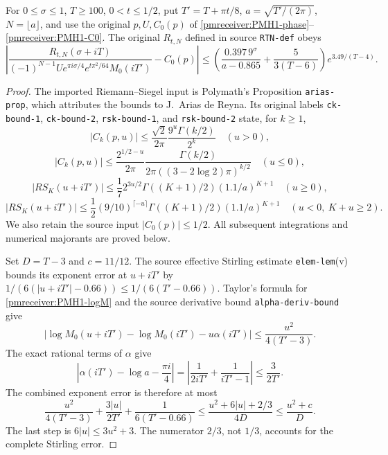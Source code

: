 \begin{pmreceivertheorem}
\label{pmreceiver:PMH11}
For $0\le\sigma\le1$, $T\ge100$, $0<t\le1/2$, put
$T'=T+\pi t/8$, $a=\sqrt{T'/(2\pi)}$, $N=\lfloor a\rfloor$,
and use the original $p,U,C_0(p)$ of
\eqref{pmreceiver:PMH1-phase}--\eqref{pmreceiver:PMH1-C0}. The original $R_{t,N}$
defined in source \texttt{RTN-def} obeys
\begin{equation}\label{pmreceiver:PMH11-final}
 \left|\frac{R_{t,N}(\sigma+iT)}
 {(-1)^{N-1}Ue^{\pi i\sigma/4}e^{t\pi^2/64}M_0(iT')}-C_0(p)\right|
 \le\left(\frac{0.397\,9^\sigma}{a-0.865}
               +\frac5{3(T-6)}\right)e^{3.49/(T-4)}.
\end{equation}
\end{pmreceivertheorem}
\begin{proof}
The imported Riemann--Siegel input is Polymath's Proposition
\texttt{arias-prop}, which attributes the bounds to J.~Arias de
Reyna. Its original labels \texttt{ck-bound-1},
\texttt{ck-bound-2}, \texttt{rsk-bound-1}, and
\texttt{rsk-bound-2} state, for $k\ge1$,
\[
 |C_k(p,u)|\le\frac{\sqrt2}{2\pi}
       \frac{9^u\Gamma(k/2)}{2^k}\quad(u>0),
\]
\[
 |C_k(p,u)|\le\frac{2^{1/2-u}}{2\pi}
       \frac{\Gamma(k/2)}{2\pi((3-2\log2)\pi)^{k/2}}
       \quad(u\le0),
\]
\[
 |RS_K(u+iT')|\le\frac17 2^{3u/2}\Gamma((K+1)/2)(1.1/a)^{K+1}
       \quad(u\ge0),
\]
\[
 |RS_K(u+iT')|\le\frac12(9/10)^{\lceil-u\rceil}
       \Gamma((K+1)/2)(1.1/a)^{K+1}
       \quad(u<0,\ K+u\ge2).
\]
We also retain the source input $|C_0(p)|\le1/2$. All subsequent
integrations and numerical majorants are proved below.

Set $D=T-3$ and $c=11/12$. The source effective Stirling estimate
\texttt{elem-lem}(v) bounds its exponent error at $u+iT'$ by
$1/(6(|u+iT'|-0.66))\le1/(6(T'-0.66))$.
Taylor's formula for \eqref{pmreceiver:PMH1-logM} and the source derivative
bound \texttt{alpha-deriv-bound} give
\[
 |\log M_0(u+iT')-\log M_0(iT')-u\alpha(iT')|
 \le\frac{u^2}{4(T'-3)}.
\]
The exact rational terms of $\alpha$ give
\[
 \left|\alpha(iT')-\log a-\frac{\pi i}{4}\right|
 =\left|\frac1{2iT'}+\frac1{iT'-1}\right|\le\frac3{2T'}.
\]
The combined exponent error is therefore at most
\begin{equation}\label{pmreceiver:PMH11-pointwise}
 \frac{u^2}{4(T'-3)}+\frac{3|u|}{2T'}+\frac1{6(T'-0.66)}
 \le\frac{u^2+6|u|+2/3}{4D}
 \le\frac{u^2+c}{D}.
\end{equation}
The last step is $6|u|\le3u^2+3$. The numerator $2/3$, not
$1/3$, accounts for the complete Stirling error.


\end{proof}
